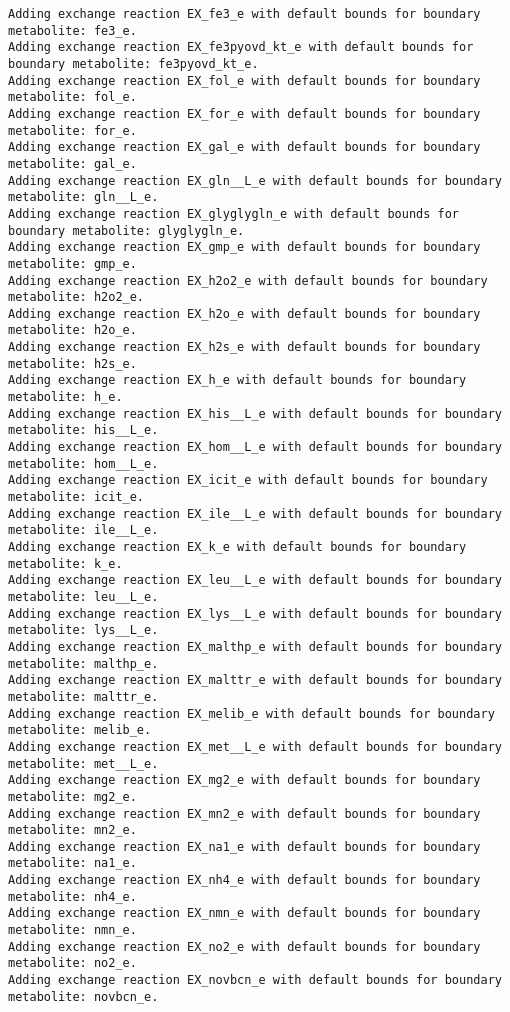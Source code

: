 \documentclass[
  letterpaper,
  DIV=11,
  numbers=noendperiod]{scrartcl}
\begin{document}
\begin{verbatim}
Adding exchange reaction EX_fe3_e with default bounds for boundary metabolite: fe3_e.
Adding exchange reaction EX_fe3pyovd_kt_e with default bounds for boundary metabolite: fe3pyovd_kt_e.
Adding exchange reaction EX_fol_e with default bounds for boundary metabolite: fol_e.
Adding exchange reaction EX_for_e with default bounds for boundary metabolite: for_e.
Adding exchange reaction EX_gal_e with default bounds for boundary metabolite: gal_e.
Adding exchange reaction EX_gln__L_e with default bounds for boundary metabolite: gln__L_e.
Adding exchange reaction EX_glyglygln_e with default bounds for boundary metabolite: glyglygln_e.
Adding exchange reaction EX_gmp_e with default bounds for boundary metabolite: gmp_e.
Adding exchange reaction EX_h2o2_e with default bounds for boundary metabolite: h2o2_e.
Adding exchange reaction EX_h2o_e with default bounds for boundary metabolite: h2o_e.
Adding exchange reaction EX_h2s_e with default bounds for boundary metabolite: h2s_e.
Adding exchange reaction EX_h_e with default bounds for boundary metabolite: h_e.
Adding exchange reaction EX_his__L_e with default bounds for boundary metabolite: his__L_e.
Adding exchange reaction EX_hom__L_e with default bounds for boundary metabolite: hom__L_e.
Adding exchange reaction EX_icit_e with default bounds for boundary metabolite: icit_e.
Adding exchange reaction EX_ile__L_e with default bounds for boundary metabolite: ile__L_e.
Adding exchange reaction EX_k_e with default bounds for boundary metabolite: k_e.
Adding exchange reaction EX_leu__L_e with default bounds for boundary metabolite: leu__L_e.
Adding exchange reaction EX_lys__L_e with default bounds for boundary metabolite: lys__L_e.
Adding exchange reaction EX_malthp_e with default bounds for boundary metabolite: malthp_e.
Adding exchange reaction EX_malttr_e with default bounds for boundary metabolite: malttr_e.
Adding exchange reaction EX_melib_e with default bounds for boundary metabolite: melib_e.
Adding exchange reaction EX_met__L_e with default bounds for boundary metabolite: met__L_e.
Adding exchange reaction EX_mg2_e with default bounds for boundary metabolite: mg2_e.
Adding exchange reaction EX_mn2_e with default bounds for boundary metabolite: mn2_e.
Adding exchange reaction EX_na1_e with default bounds for boundary metabolite: na1_e.
Adding exchange reaction EX_nh4_e with default bounds for boundary metabolite: nh4_e.
Adding exchange reaction EX_nmn_e with default bounds for boundary metabolite: nmn_e.
Adding exchange reaction EX_no2_e with default bounds for boundary metabolite: no2_e.
Adding exchange reaction EX_novbcn_e with default bounds for boundary metabolite: novbcn_e.

\end{verbatim}
\end{document}
